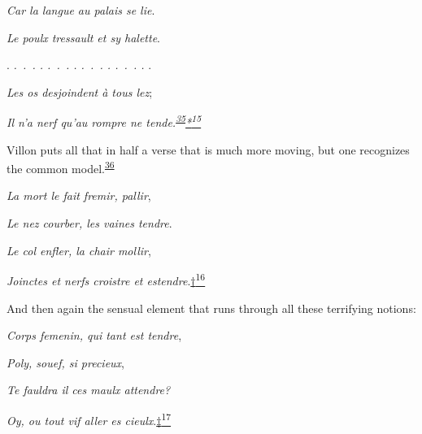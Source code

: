 \emph{Car la langue au palais se lie}.

\emph{Le poulx tressault et sy halette}.

. \emph{.~.~. . .~.~. . .~.~. . .~.~. .} .

\emph{\protect\hypertarget{12_Chapter_Five__THE_VISION_OF_DEAT.xhtmlux5cux23page_169}{}{}Les
os desjoindent à tous lez};

\emph{Il n'a nerf qu'au rompre ne
tende.\textsuperscript{\protect\hypertarget{12_Chapter_Five__THE_VISION_OF_DEAT.xhtmlux5cux23id_1282}{\protect\hyperlink{23_NOTES.xhtmlux5cux23id_1283}{35}}}\protect\hypertarget{12_Chapter_Five__THE_VISION_OF_DEAT.xhtmlux5cux23id_2979}{\protect\hyperlink{23_NOTES.xhtmlux5cux23id_2980}{*\textsuperscript{15}}}}

Villon puts all that in half a verse that is much more moving, but one
recognizes the common
model.\textsuperscript{\protect\hypertarget{12_Chapter_Five__THE_VISION_OF_DEAT.xhtmlux5cux23id_1280}{\protect\hyperlink{23_NOTES.xhtmlux5cux23id_1281}{36}}}

\emph{La mort le fait fremir, pallir},

\emph{Le nez courber, les vaines tendre}.

\emph{Le col enfler, la chair mollir},

\emph{Joinctes et nerfs croistre et
estendre}.\protect\hypertarget{12_Chapter_Five__THE_VISION_OF_DEAT.xhtmlux5cux23id_2981}{\protect\hyperlink{23_NOTES.xhtmlux5cux23id_2982}{†\textsuperscript{16}}}

And then again the sensual element that runs through all these
terrifying notions:

\emph{Corps femenin, qui tant est tendre},

\emph{Poly, souef, si precieux},

\emph{Te fauldra il ces maulx attendre?}

\emph{Oy, ou tout vif aller es
cieulx}.\protect\hypertarget{12_Chapter_Five__THE_VISION_OF_DEAT.xhtmlux5cux23id_2983}{\protect\hyperlink{23_NOTES.xhtmlux5cux23id_2984}{‡\textsuperscript{17}}}

